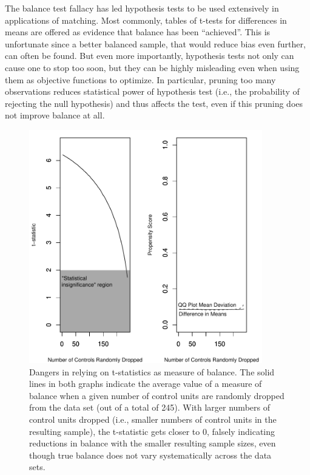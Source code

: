 \documentclass[11pt,titlepage]{article}
\begin{document}
The balance test fallacy has led hypothesis tests to be used
extensively in applications of matching.  Most commonly, tables of
t-tests for differences in means are offered as evidence that balance
has been ``achieved''.  This is unfortunate since a better balanced
sample, that would reduce bias even further, can often be found.  But
even more importantly, hypothesis tests not only can cause one to stop
too soon, but they can be highly misleading even when using them as
objective functions to optimize.  In particular, pruning too many
observations reduces statistical power of hypothesis test (i.e., the
probability of rejecting the null hypothesis) and thus affects the
test, even if this pruning does not improve balance at all.

\begin{figure}[t] 
 \begin{center}
   \includegraphics[height=4in]{figs/TStatPlotPscore.pdf}
  \end{center}
  \vspace{-0.275in}
  \caption{Dangers in relying on t-statistics as measure of balance.
    The solid lines in both graphs indicate the average value of a
    measure of balance when a given number of control units are
    randomly dropped from the data set (out of a total of 245).  With
    larger numbers of control units dropped (i.e., smaller numbers of
    control units in the resulting sample), the t-statistic gets
    closer to 0, falsely indicating reductions in balance with the
    smaller resulting sample sizes, even though true balance does not
    vary systematically across the data sets.}
  \label{f:tstat}
\end{figure}
\end{document}
